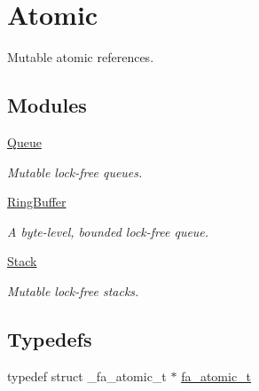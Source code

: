 \hypertarget{group___fa_atomic}{\section{Atomic}
\label{group___fa_atomic}
}


Mutable atomic references.  


\subsection*{Modules}
\begin{DoxyCompactItemize}
\item 
\hyperlink{group___fa_atomic_queue}{Queue}
\begin{DoxyCompactList}\small\item\em Mutable lock-\/free queues. \end{DoxyCompactList}\item 
\hyperlink{group___fa_atomic_ring_buffer}{Ring\-Buffer}
\begin{DoxyCompactList}\small\item\em A byte-\/level, bounded lock-\/free queue. \end{DoxyCompactList}\item 
\hyperlink{group___fa_atomic_stack}{Stack}
\begin{DoxyCompactList}\small\item\em Mutable lock-\/free stacks. \end{DoxyCompactList}\end{DoxyCompactItemize}
\subsection*{Typedefs}
\begin{DoxyCompactItemize}
\item 
typedef struct \-\_\-fa\-\_\-atomic\-\_\-t $\ast$ \hyperlink{group___fa_atomic_gaa3c9a8cdc36169052d96fa152e2eb9ae}{fa\-\_\-atomic\-\_\-t}
\end{DoxyCompactItemize}
